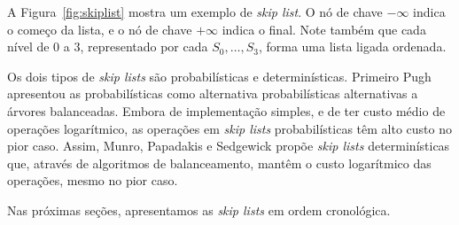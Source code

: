 \documentclass[paper=a4, fontsize=11pt]{scrartcl} %
\numberwithin{equation}{section}
\numberwithin{figure}{section}
\numberwithin{table}{section}
\numberwithin{definition}{section}
\numberwithin{theorem}{section}
\numberwithin{property}{section}
\numberwithin{proposition}{section}
\newcommand{\sls}{\textit{skip lists}\xspace}
\newcommand{\skl}{\textit{skip list}\xspace}
\begin{document}
A Figura~\ref{fig:skiplist} mostra um exemplo de \skl. 
O nó de chave $-\infty$ indica o começo da lista, e o nó de chave $+\infty$ indica o final.
Note também que cada nível de 0 a 3, representado por cada $S_0, \ldots, S_3$, forma uma lista ligada ordenada.

Os dois tipos de \sls são probabilísticas e determinísticas. Primeiro Pugh apresentou 
as probabilísticas \cite{pugh1990skip} como alternativa probabilísticas alternativas
a árvores balanceadas. Embora de implementação simples, e de ter custo médio de operações logarítmico, 
as operações em \sls probabilísticas têm alto custo no pior caso. Assim, Munro, Papadakis e 
Sedgewick propõe \sls determinísticas \cite{munro1992deterministic} que, através de algoritmos de balanceamento, mantêm o custo
logarítmico das operações, mesmo no pior caso.

Nas próximas seções, apresentamos as \sls em ordem cronológica. 
\end{document}
